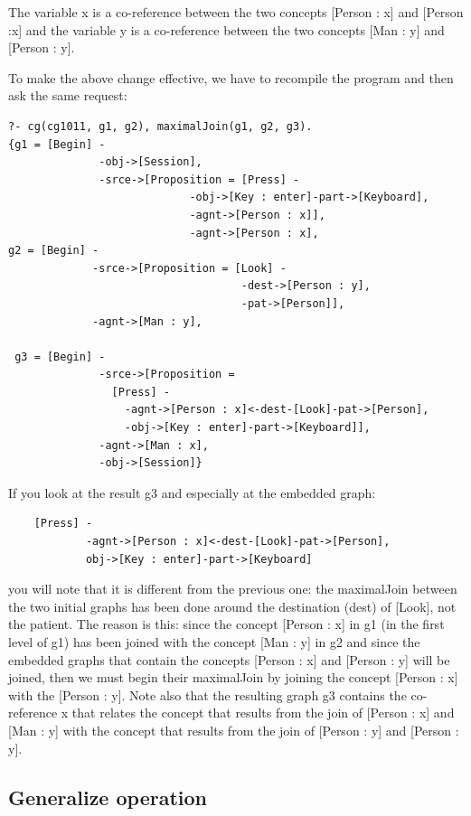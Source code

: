 \documentclass{book}
\begin{document}
The variable x is a co-reference between the two concepts [Person : x]
and [Person :x] and the variable y is a co-reference between the two
concepts [Man : y] and [Person : y].

To make the above change effective, we have to recompile the program
and then ask the same request:


\begin{verbatim}
?- cg(cg1011, g1, g2), maximalJoin(g1, g2, g3).
{g1 = [Begin] -
              -obj->[Session],
              -srce->[Proposition = [Press] -
                            -obj->[Key : enter]-part->[Keyboard],
                            -agnt->[Person : x]],
                            -agnt->[Person : x], 
g2 = [Begin] -
             -srce->[Proposition = [Look] -
                                    -dest->[Person : y],
                                    -pat->[Person]],
             -agnt->[Man : y],

 g3 = [Begin] -
              -srce->[Proposition =
                [Press] -
                  -agnt->[Person : x]<-dest-[Look]-pat->[Person],
                  -obj->[Key : enter]-part->[Keyboard]],
              -agnt->[Man : x],
              -obj->[Session]}
\end{verbatim}



If you look at the result g3 and especially at the embedded graph:


\begin{verbatim}
    [Press] -
            -agnt->[Person : x]<-dest-[Look]-pat->[Person],
            obj->[Key : enter]-part->[Keyboard]
\end{verbatim}


you will note that it is different from the previous one: the
maximalJoin between the two initial graphs has been done around the
destination (dest) of [Look], not the patient. The reason is this:
since the concept [Person : x] in g1 (in the first level of g1) has
been joined with the concept [Man : y] in g2 and since the embedded
graphs that contain the concepts [Person : x] and [Person : y] will be
joined, then we must begin their maximalJoin by joining the concept
[Person : x] with the [Person : y]. Note also that the resulting graph
g3 contains the co-reference x that relates the concept that results
from the join of [Person : x] and [Man : y] with the concept that
results from the join of [Person : y] and [Person : y].



\subsection{Generalize operation}
\end{document}
